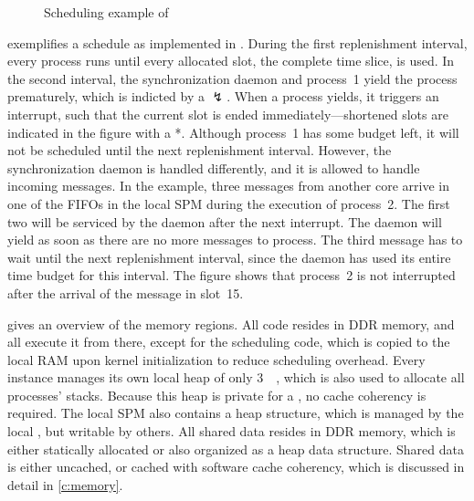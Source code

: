 \def\yieldsym{\ensuremath{\lightning}\xspace}
\begin{figure}%
%
\caption{Scheduling example of \Helix}%
\label{fig:starburst:scheduler}%
\end{figure}

 exemplifies a schedule as implemented in \Helix.
During the first replenishment interval, every process runs until every allocated slot, \ie the complete time slice, is used.
In the second interval, the synchronization daemon and process~1 yield the process prematurely, which is indicted by a \yieldsym.
When a process yields, it triggers an interrupt, such that the current slot is ended immediately---shortened slots are indicated in the figure with a *.
Although process~1 has some budget left, it will not be scheduled until the next replenishment interval.
However, the synchronization daemon is handled differently, and it is allowed to handle incoming messages.
In the example, three messages from another core arrive in one of the \acp{FIFO} in the local \ac{SPM} during the execution of process~2.
The first two will be serviced by the daemon after the next interrupt.
The daemon will yield as soon as there are no more messages to process.
The third message has to wait until the next replenishment interval, since the daemon has used its entire time budget for this interval.
The figure shows that process~2 is not interrupted after the arrival of the message in slot~15.

 gives an overview of the memory regions.
All code resides in \ac{DDR} memory, and all \MicroBlazes execute it from there, except for the scheduling code, which is copied to the local \ac{RAM} upon kernel initialization to reduce scheduling overhead.
Every \Helix instance manages its own local heap of only \SI{3}{\mega\byte}, which is also used to allocate all processes' stacks.
Because this heap is private for a \MicroBlaze, no cache coherency is required.
The local \ac{SPM} also contains a heap structure, which is managed by the local \MicroBlaze, but writable by others.
All shared data resides in \ac{DDR} memory, which is either statically allocated or also organized as a heap data structure.
Shared data is either uncached, or cached with software cache coherency, which is discussed in detail in \cref{c:memory}.

